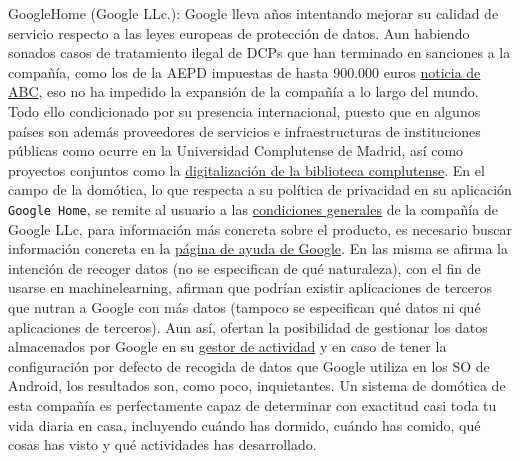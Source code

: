 \vspace{1cm}

GoogleHome (Google LLc.): Google lleva años intentando mejorar su calidad de servicio respecto a las leyes europeas de protección de datos. Aun habiendo sonados casos de tratamiento ilegal de DCPs que han terminado en sanciones a la compañía, como los de la AEPD impuestas de hasta 900.000 euros \href{https://www.abc.es/tecnologia/redes/20131219/abci-google-multa-aepd-201312191217.html}{noticia de ABC}, eso no ha impedido la expansión de la compañía a lo largo del mundo. Todo ello condicionado por su presencia internacional, puesto que en algunos países son además proveedores de servicios e infraestructuras de instituciones públicas como ocurre en la Universidad Complutense de Madrid, así como proyectos conjuntos como la \href{https://biblioteca.ucm.es/google8}{digitalización de la biblioteca complutense}. En el campo de la domótica, lo que respecta a su política de privacidad en su aplicación \verb|Google Home|, se remite al usuario a las \href{https://policies.google.com/privacy?hl=es}{condiciones generales} de la compañía de Google LLc, para información más concreta sobre el producto, es necesario buscar información concreta en la \href{https://support.google.com/googlehome/answer/7072285?hl=es&ref_topic=7173611}{página de ayuda de Google}. En las misma se afirma la intención de recoger datos (no se especifican de qué naturaleza), con el fin de usarse en \gls{machinelearning}, afirman que podrían existir aplicaciones de terceros que nutran a Google con más datos (tampoco se especifican qué datos ni qué aplicaciones de terceros). Aun así, ofertan la posibilidad de gestionar los datos almacenados por Google en su \href{https://myactivity.google.com/}{gestor de actividad} y en caso de tener la configuración por defecto de recogida de datos que Google utiliza en los SO de Android, los resultados son, como poco, inquietantes. Un sistema de domótica de esta compañía es perfectamente capaz de determinar con exactitud casi toda tu vida diaria en casa, incluyendo cuándo has dormido, cuándo has comido, qué cosas has visto y qué actividades has desarrollado.

\vspace{1cm}

